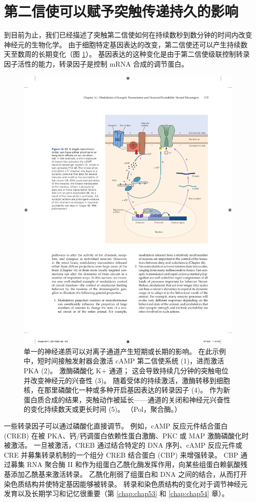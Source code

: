 \section{第二信使可以赋予突触传递持久的影响}

到目前为止，我们已经描述了突触第二信使如何在持续数秒到数分钟的时间内改变神经元的生物化学。 
由于细胞特定基因表达的改变，第二信使还可以产生持续数天至数周的长期变化（图 \ref{fig:14_12}）。 
基因表达的这种变化是由于第二信使级联控制转录因子活性的能力，转录因子是控制 mRNA 合成的调节蛋白。

\begin{figure}[htbp]
	\centering
	\includegraphics[width=0.7\linewidth]{chap14/fig_14_12}
	\caption{单一的神经递质可以对离子通道产生短期或长期的影响。 在此示例中，短时间接触发射器会激活 cAMP 第二信使系统 (1)，进而激活 PKA (2)。 激酶磷酸化 K+ 通道； 这会导致持续几分钟的突触电位并改变神经元的兴奋性 (3)。 随着受体的持续激活，激酶转移到细胞核，在那里磷酸化一种或多种开启基因表达的转录因子 (4)。 作为新蛋白质合成的结果，突触动作被延长——通道的关闭和神经元兴奋性的变化持续数天或更长时间 (5)。 （Pol，聚合酶。）}
	\label{fig:14_12}
\end{figure}


一些转录因子可以通过磷酸化直接调节。 
例如，cAMP 反应元件结合蛋白 (CREB) 在被 PKA、钙/钙调蛋白依赖性蛋白激酶、PKC 或 MAP 激酶磷酸化时被激活。 
一旦被激活，CREB 通过结合特定的 DNA 序列、cAMP 反应元件或 CRE 并募集转录机制的一个组分 CREB 结合蛋白 (CBP) 来增强转录。 
CBP 通过募集 RNA 聚合酶 II 和作为组蛋白乙酰化酶发挥作用，向某些组蛋白赖氨酸残基添加乙酰基来激活转录。 
乙酰化削弱了组蛋白和 DNA 之间的结合，从而打开染色质结构并使特定基因能够被转录。 
转录和染色质结构的变化对于调节神经元发育以及长期学习和记忆很重要（第 \ref{chap:chap53} 和 \ref{chap:chap54} 章）。


